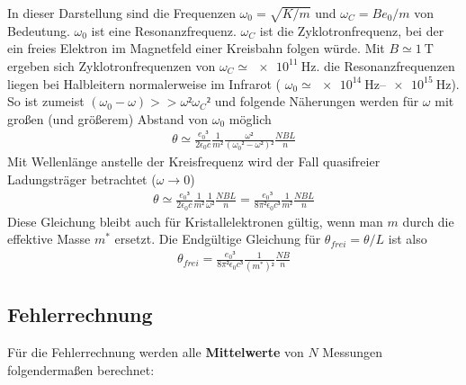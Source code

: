 In dieser Darstellung sind die Frequenzen $\omega_0  = \sqrt{K/m}$ und $\omega_C = Be_0/m$ von Bedeutung.
$\omega_0$ ist eine Resonanzfrequenz. $\omega_C$ ist die Zyklotronfrequenz, bei der ein freies Elektron 
im Magnetfeld einer Kreisbahn folgen würde.
Mit $B \simeq \qty{1}{\tesla}$ ergeben sich Zyklotronfrequenzen von $\omega_C \simeq \qty{e11}{\hertz}$.
die Resonanzfrequenzen liegen bei Halbleitern normalerweise im Infrarot ( $\omega_0 \simeq \qtyrange{e14}{e15}{\hertz}$).
So ist zumeist $(\omega_0- \omega)>> \omega² \omega_C²$
und folgende Näherungen werden für $\omega$ mit großen (und größerem) Abstand von $\omega_0$ möglich
\begin{align}
	\theta \simeq \frac{e_0³}{2\epsilon_0 c}\frac{1}{m²}\frac{\omega²}{(\omega_0²- \omega²)²}\frac{NBL}{n}%
\end{align}
Mit Wellenlänge anstelle der Kreisfrequenz wird der Fall quasifreier Ladungsträger betrachtet ($\omega \rightarrow 0$)
\begin{align}
	\theta \simeq  \frac{e_0³}{2\epsilon_0 c}\frac{1}{m²}\frac{1}{\omega²}\frac{NBL}{n}%
	= \frac{e_0³}{8\pi²\epsilon_0 c³}\frac{1}{m²}\frac{NBL}{n}
\end{align}
Diese Gleichung bleibt auch für Kristallelektronen gültig, wenn man $m$ durch die effektive Masse $m^*$ ersetzt.
Die Endgültige Gleichung für $\theta_{frei} = \theta / L$ ist also 
\begin{align}
	\theta_{frei} = \frac{e_0³}{8\pi²\epsilon_0 c³}\frac{1}{(m^*)²}\frac{NB}{n}
	\label{eq:theta_final}
\end{align}





\subsection{Fehlerrechnung}
Für die Fehlerrechnung werden alle \textbf{Mittelwerte} von $N$ Messungen
folgendermaßen berechnet:

